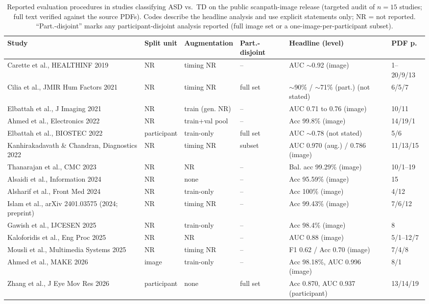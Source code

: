 \begin{table}[htbp]
\centering\scriptsize
\caption{Reported evaluation procedures in studies classifying ASD vs.\ TD on the public scanpath-image release (targeted audit of $n=15$ studies; full text verified against the source PDFs). Codes describe the headline analysis and use explicit statements only; NR = not reported. ``Part.-disjoint'' marks any participant-disjoint analysis reported (full image set or a one-image-per-participant subset).}
\label{tab:lit-audit}
\begin{tabular}{@{}llllll@{}}
\toprule
Study & Split unit & Augmentation & Part.-disjoint & Headline (level) & PDF p. \\
\midrule
Carette et al., HEALTHINF 2019 & NR & timing NR & -- & AUC $\sim$0.92 (image) & 1–20/9/13 \\
Cilia et al., JMIR Hum Factors 2021 & NR & timing NR & full set & $\sim$90\% / $\sim$71\% (part.) (not stated) & 6/5/7 \\
Elbattah et al., J Imaging 2021 & NR & train (gen. NR) & -- & AUC 0.71 to 0.76 (image) & 10/11 \\
Ahmed et al., Electronics 2022 & NR & train+val pool & -- & Acc 99.8\% (image) & 14/19/1 \\
Elbattah et al., BIOSTEC 2022 & participant & train-only & full set & AUC $\sim$0.78 (not stated) & 5/6 \\
Kanhirakadavath \& Chandran, Diagnostics 2022 & NR & timing NR & subset & AUC 0.970 (aug.) / 0.786 (image) & 11/13/15 \\
Thanarajan et al., CMC 2023 & NR & NR & -- & Bal. acc 99.29\% (image) & 10/1–19 \\
Alsaidi et al., Information 2024 & NR & none & -- & Acc 95.59\% (image) & 15 \\
Alsharif et al., Front Med 2024 & NR & train-only & -- & Acc 100\% (image) & 4/12 \\
Islam et al., arXiv 2401.03575 (2024; preprint) & NR & timing NR & -- & Acc 99.43\% (image) & 7/6/12 \\
Gawish et al., IJCESEN 2025 & NR & train-only & -- & Acc 98.4\% (image) & 8 \\
Kaloforidis et al., Eng Proc 2025 & NR & NR & -- & AUC 0.88 (image) & 5/1–12/7 \\
Mousli et al., Multimedia Systems 2025 & NR & timing NR & -- & F1 0.62 / Acc 0.70 (image) & 7/4/8 \\
Ahmed et al., MAKE 2026 & image & train-only & -- & Acc 98.18\%, AUC 0.996 (image) & 8/1 \\
Zhang et al., J Eye Mov Res 2026 & participant & none & full set & Acc 0.870, AUC 0.937 (participant) & 13/14/19 \\
\bottomrule
\end{tabular}
\end{table}